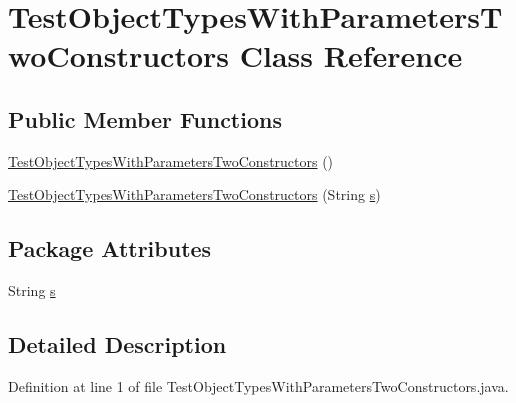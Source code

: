 \hypertarget{classTestObjectTypesWithParametersTwoConstructors}{
\section{TestObjectTypesWithParametersTwoConstructors Class Reference}
\label{classTestObjectTypesWithParametersTwoConstructors}
}
\subsection*{Public Member Functions}
\begin{DoxyCompactItemize}
\item 
\hyperlink{classTestObjectTypesWithParametersTwoConstructors_ab71baff3303f45deb4144759543b603e}{TestObjectTypesWithParametersTwoConstructors} ()
\item 
\hyperlink{classTestObjectTypesWithParametersTwoConstructors_a9723b549e228ab416ff2a672873c313a}{TestObjectTypesWithParametersTwoConstructors} (String \hyperlink{classTestObjectTypesWithParametersTwoConstructors_a939b5db97988d501db704b560bf43d64}{s})
\end{DoxyCompactItemize}
\subsection*{Package Attributes}
\begin{DoxyCompactItemize}
\item 
String \hyperlink{classTestObjectTypesWithParametersTwoConstructors_a939b5db97988d501db704b560bf43d64}{s}
\end{DoxyCompactItemize}


\subsection{Detailed Description}


Definition at line 1 of file TestObjectTypesWithParametersTwoConstructors.java.



